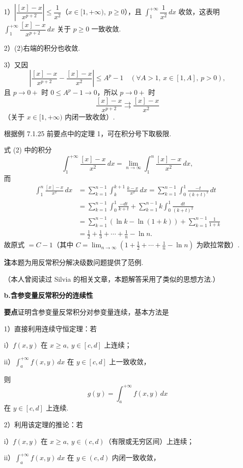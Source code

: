 \documentclass[UTF8,12pt,a4paper,fontset=fandol]{ctexart}
\begin{document}
1）$\left|\dfrac{[x]-x}{x^{p+2}}\right|\le\dfrac1{x^2}$（$x\in[1,+\infty),\ p\ge0$），且 $\displaystyle\int_1^{+\infty}\dfrac1{x^2}\,dx$ 收敛，这表明 $\displaystyle\int_1^{+\infty}\dfrac{[x]-x}{x^{p+2}}\,dx$ 关于 $p\ge0$ 一致收敛.

2）(2)右端的积分也收敛.

3）又因
\[
\left|\frac{[x]-x}{x^{p+2}}-\frac{[x]-x}{x^2}\right|\le A^p-1\quad(\forall A>1,\ x\in[1,A],\ p>0),
\]
且 $p\to0+$ 时 $0\le A^p-1\to0$，所以 $p\to0+$ 时
\[
\frac{[x]-x}{x^{p+2}}\rightrightarrows\frac{[x]-x}{x^2}
\]
（关于 $x\in[1,+\infty)$ 内闭一致收敛）.

根据例 7.1.25 前要点中的定理 1，可在积分号下取极限.

式 (2) 中的积分
\[
\int_1^{+\infty}\frac{[x]-x}{x^2}\,dx
=\lim_{n\to\infty}\int_1^n\frac{[x]-x}{x^2}\,dx,
\]
而
\[
\begin{aligned}
\int_1^n\frac{[x]-x}{x^2}\,dx
&=\sum_{k=1}^{n-1}\int_k^{k+1}\frac{k-x}{x^2}\,dx
=\sum_{k=1}^{n-1}\int_0^1\frac{-t}{(k+t)^2}\,dt\\
&=\sum_{k=1}^{n-1}\int_0^1\frac{-dt}{k+t}
+\sum_{k=1}^{n-1}k\int_0^1\frac{dt}{(k+t)^2}\\
&=\sum_{k=1}^{n-1}(\ln k-\ln(1+k))+\sum_{k=1}^{n-1}\frac1{1+k}\\
&=\frac12+\frac13+\cdots+\frac1n-\ln n.
\end{aligned}
\]
故原式 $=C-1$（其中 $C=\displaystyle\lim_{n\to\infty}\left(1+\frac12+\cdots+\frac1n-\ln n\right)$ 为欧拉常数）.

\noindent\textbf{注}\quad 本题为用反常积分解决级数问题提供了范例.

（本人曾阅读过 Silvia 的相关文章，本题解答采用了类似的思想方法.）

\noindent\textbf{b.\quad 含参变量反常积分的连续性}

\noindent\textbf{要点}\quad 证明含参变量反常积分对参变量连续，基本方法是

1）直接利用连续守恒定理：若

i）$f(x,y)$ 在 $x\ge a,\ y\in[c,d]$ 上连续；

ii）$\displaystyle\int_a^{+\infty}f(x,y)\,dx$ 在 $y\in[c,d]$ 上一致收敛，

则
\[
g(y)=\int_a^{+\infty}f(x,y)\,dx
\]
在 $y\in[c,d]$ 上连续.

2）利用该定理的推论：若

i）$f(x,y)$ 在 $x\ge a,\ y\in(c,d)$（有限或无穷区间）上连续；

ii）$\displaystyle\int_a^{+\infty}f(x,y)\,dx$ 在 $y\in(c,d)$ 内闭一致收敛，
\end{document}
